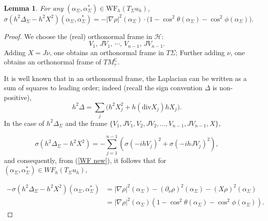 \documentclass[11pt,reqno]{amsart}
\newcommand{\C}{{\mathbb C}}
\newcommand{\WF}{\text{WF}}
\newtheorem{lemma}[theorem]{Lemma}
\theoremstyle{definition}
\def\p{\partial}
\begin{document}
\begin{lemma}\label{lem sum of squares}
    For any $ (\alpha_{\Sigma}, \alpha_{\Sigma}^*) \in \WF_h(T_\Sigma u_h)$, 
    $$\sigma(h^2\Delta_{\Sigma}-h^2X^2)(\alpha_{\Sigma}, \alpha_{\Sigma}^*) = - |\nabla\rho|^2(\alpha_{\Sigma}) \cdot \big(1-\cos^2\theta(\alpha_{\Sigma})  - \cos^2\phi (\alpha_{\Sigma}) \big).$$ 
\end{lemma}
\begin{proof}
    We choose the (real) orthonormal frame in $\mathcal{H}$:
    $$
    V_1,\,JV_1,\,\cdots,\, V_{n-1},\, JV_{n-1}.
    $$
    Adding $X=J\nu$, one obtains an orthonormal frame in $T\Sigma$; Further adding $\nu$, one obtains an orthonormal frame of $TM_\tau^\C$. 

     It is well known \cite{Lee18,Mor07,Ura12} that in an orthonormal frame, the Laplacian can be written as a sum of squares to leading order; indeed (recall the sign convention $\Delta$ is non-positive),
    \begin{equation}
        h^2\Delta=\sum_j\big( h^2X_j^2+h(\text{div} X_j)hX_j\big).
    \end{equation}
    In the case of $h^2\Delta_\Sigma$ and the frame $\{V_1,JV_1, V_2, JV_2,...,V_{n-1}, J V_{n-1},X\}$, 
    

    \begin{equation}
        \sigma(h^2\Delta_\Sigma-h^2X^2)=-\sum_{j=1}^{n-1}(\sigma(-ihV_j)^2+\sigma(-ihJV_j)^2),
    \end{equation}
and consequently, from (\ref{WF new}), it follows that  for $(\alpha_\Sigma,\alpha_{\Sigma}^*) \in WF_h(T_\Sigma u_h),$

    
\begin{align}
    -\sigma(h^2\Delta_\Sigma-h^2X^2)(\alpha_\Sigma, \alpha_\Sigma^*)
    &=|\nabla\rho|^2(\alpha_\Sigma)-(\p_\nu\rho)^2(\alpha_\Sigma)-(X\rho)^2(\alpha_\Sigma) \nonumber\\
    &=|\nabla\rho|^2(\alpha_\Sigma)(1-\cos^2\theta(\alpha_\Sigma)-\cos^2\phi(\alpha_\Sigma)). 
\end{align}


\end{proof}
\end{document}
